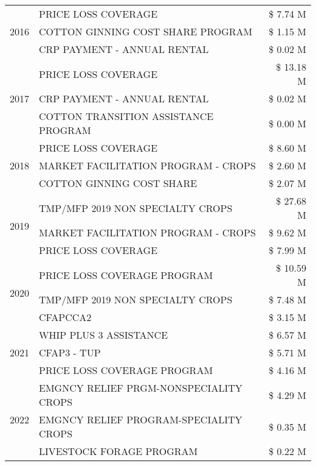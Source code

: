 \begin{tabular}{llr}
\cline{1-3}
\multirow[t]{3}{*}{2016} & PRICE LOSS COVERAGE & \$ 7.74 M \\
 & COTTON GINNING COST SHARE PROGRAM & \$ 1.15 M \\
 & CRP PAYMENT - ANNUAL RENTAL & \$ 0.02 M \\
\cline{1-3}
\multirow[t]{3}{*}{2017} & PRICE LOSS COVERAGE & \$ 13.18 M \\
 & CRP PAYMENT - ANNUAL RENTAL & \$ 0.02 M \\
 & COTTON TRANSITION ASSISTANCE PROGRAM & \$ 0.00 M \\
\cline{1-3}
\multirow[t]{3}{*}{2018} & PRICE LOSS COVERAGE & \$ 8.60 M \\
 & MARKET FACILITATION PROGRAM - CROPS & \$ 2.60 M \\
 & COTTON GINNING COST SHARE & \$ 2.07 M \\
\cline{1-3}
\multirow[t]{3}{*}{2019} & TMP/MFP 2019 NON SPECIALTY CROPS & \$ 27.68 M \\
 & MARKET FACILITATION PROGRAM - CROPS & \$ 9.62 M \\
 & PRICE LOSS COVERAGE & \$ 7.99 M \\
\cline{1-3}
\multirow[t]{3}{*}{2020} & PRICE LOSS COVERAGE PROGRAM & \$ 10.59 M \\
 & TMP/MFP 2019 NON SPECIALTY CROPS & \$ 7.48 M \\
 & CFAPCCA2 & \$ 3.15 M \\
\cline{1-3}
\multirow[t]{3}{*}{2021} & WHIP PLUS 3 ASSISTANCE & \$ 6.57 M \\
 & CFAP3 - TUP & \$ 5.71 M \\
 & PRICE LOSS COVERAGE PROGRAM & \$ 4.16 M \\
\cline{1-3}
\multirow[t]{3}{*}{2022} & EMGNCY RELIEF PRGM-NONSPECIALITY CROPS & \$ 4.29 M \\
 & EMGNCY RELIEF PROGRAM-SPECIALITY CROPS & \$ 0.35 M \\
 & LIVESTOCK FORAGE PROGRAM & \$ 0.22 M \\
\cline{1-3}
\bottomrule
\end{tabular}
